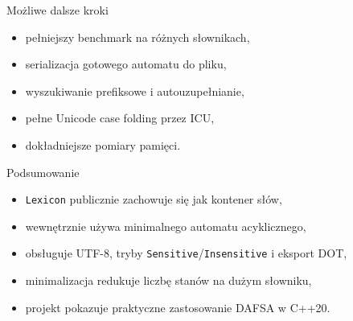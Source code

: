 \documentclass{beamer}
\begin{document}
\begin{frame}{Możliwe dalsze kroki}
    \begin{itemize}
        \item pełniejszy benchmark na różnych słownikach,
        \item serializacja gotowego automatu do pliku,
        \item wyszukiwanie prefiksowe i autouzupełnianie,
        \item pełne Unicode case folding przez ICU,
        \item dokładniejsze pomiary pamięci.
    \end{itemize}
\end{frame}

\begin{frame}{Podsumowanie}
    \begin{itemize}
        \item \texttt{Lexicon} publicznie zachowuje się jak kontener słów,
        \item wewnętrznie używa minimalnego automatu acyklicznego,
        \item obsługuje UTF-8, tryby \texttt{Sensitive}/\texttt{Insensitive} i eksport DOT,
        \item minimalizacja redukuje liczbę stanów na dużym słowniku,
        \item projekt pokazuje praktyczne zastosowanie DAFSA w C++20.
    \end{itemize}
\end{frame}

\frame{\maketitle}
\end{document}
